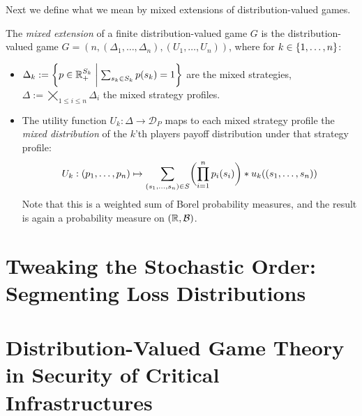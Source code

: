 \documentclass[a4paper]{scrreprt}
\newcommand{\Rp}{\mathbb{R}_+}
\newcommand{\B}{\mathcal{B}}
\newcommand{\D}{\mathcal{D}}
\begin{document}
    Next we define what we mean by mixed extensions of distribution-valued games.
    \begin{defn}
        The \emph{mixed extension} of a finite distribution-valued game $G$ is the distribution-valued game $\hat{G} = (n, (\Delta_1, \dots, \Delta_n), (U_1, \dots, U_n))$,
        where for $k \in \{1, \dots, n\}$:        
        \begin{itemize} %
            \item $\Delta_k := \biggset{ p \in \Rp^{S_k} \biggmid \sum_{s_k \in S_k} p(s_k) = 1 } $ are the mixed strategies, $\Delta := \bigtimes\limits_{1\leq i \leq n} \Delta_i$ the mixed strategy profiles.
            
            \item
            The utility function $U_k: \Delta \to \D_P$ maps to each mixed strategy profile the \emph{mixed distribution} of the $k$'th players payoff distribution under that strategy profile:
            \begin{gather}
                U_k: 
                (p_1, \dots, p_n) 
                \mapsto
                \sum_{(s_1, \dots, s_n) \in S} \biggl(\prod_{i=1}^{n} p_i(s_i)\biggr) * u_k( (s_1, \dots, s_n) )
                \label{eq:marginalDistMixedStrategyUtility}
            \end{gather}
            Note that this is a weighted sum of Borel probability measures, and the result is again a probability measure on $(\R, \B)$.
        \end{itemize}
    \end{defn}
    
    \chapter{Tweaking the Stochastic Order: Segmenting Loss Distributions}
    
    
    \chapter{Distribution-Valued Game Theory in Security of Critical Infrastructures}
    
\end{document}
